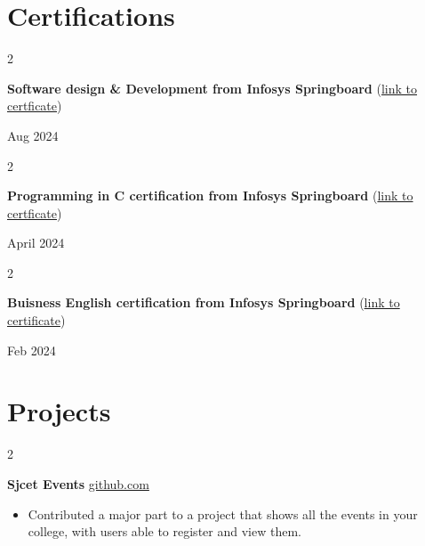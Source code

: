 \documentclass[10pt, letterpaper]{article}
\newenvironment{highlights}{
    \begin{itemize}[
        topsep=0.10 cm,
        parsep=0.10 cm,
        partopsep=0pt,
        itemsep=0pt,
        leftmargin=0 cm + 10pt
    ]
}{
    \end{itemize}
} %
\newenvironment{twocolentry}[2][]{
    \onecolentry
    \def\secondColumn{#2}
    \setcolumnwidth{\fill, 4.5 cm}
    \begin{paracol}{2}
}{
    \switchcolumn \raggedleft \secondColumn
    \end{paracol}
    \endonecolentry
} %
\begin{document}
    
    \section{Certifications}



        
        \begin{samepage}
            \begin{twocolentry}{
                Aug 2024
            }
                \textbf{Software design \& Development from Infosys Springboard}
                (\href{https://example.com}{link to certficate})
                \end{twocolentry}
            \begin{twocolentry}{
                April 2024
            }
                \textbf{Programming in C certification from Infosys Springboard} (\href{https://example.com}{link to certficate})
                \end{twocolentry}
                
            \begin{twocolentry}{
                Feb 2024
            }
                \textbf{Buisness English certification from Infosys Springboard} (\href{https://example.com}{link to certificate})
                \end{twocolentry}
        \end{samepage}


    
    \section{Projects}

            \begin{twocolentry}{
            \href{https://github.com/TimsTittus/Sjcet-Events}{github.com}
        }
            \textbf{Sjcet Events}\end{twocolentry}

        \vspace{0.10 cm}
        
            \begin{highlights}
                \item Contributed a major part to a project that shows all the events in your college, with users able to register and view them.
            \end{highlights}

        \vspace{0.10 cm}
\end{document}
